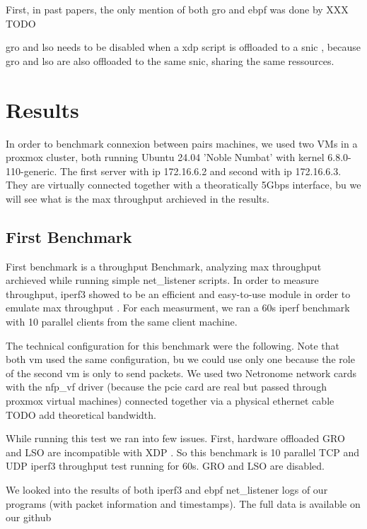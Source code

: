 \documentclass[conference]{IEEEtran}
\begin{document}
First, in past papers, the only mention of both \gls{gro} and \gls{ebpf} was done by XXX TODO

\gls{gro} and \gls{lso} needs to be disabled when a \gls{xdp} script is offloaded to a \gls{snic} \cite{noauthor_ebpf_nodate}, because \gls{gro} and \gls{lso} are also offloaded to the same \gls{snic}, sharing the same ressources. %


\section{Results}
In order to benchmark connexion between pairs machines, we used two VMs in a proxmox cluster, both running Ubuntu 24.04 'Noble Numbat' with kernel 6.8.0-110-generic. The first server with ip 172.16.6.2 and second with ip 172.16.6.3.
They are virtually connected together with a theoratically 5Gbps interface, bu we will see what is the max throughput archieved in the results.

\subsection{First Benchmark}

First benchmark is a throughput Benchmark, analyzing max throughput archieved while running simple net\_listener scripts. In order to measure throughput, iperf3 showed to be an efficient and easy-to-use module in order to emulate max throughput \cite{bachl_flow-based_2022}. For each measurment, we ran a 60s iperf benchmark with 10 parallel clients from the same client machine.

The technical configuration for this benchmark were the following. Note that both \gls{vm} used the same configuration, bu we could use only one because the role of the second \gls{vm} is only to send packets. We used two Netronome network cards with the nfp\_vf driver (because the pcie card are real but passed through proxmox virtual machines) connected together via a physical ethernet cable TODO add theoretical bandwidth. 

While running this test we ran into few issues. First, hardware offloaded GRO and LSO are incompatible with XDP \cite{noauthor_ebpf_nodate}. So this benchmark is 10 parallel TCP and UDP iperf3 throughput test running for 60s. GRO and LSO are disabled.

We looked into the results of both iperf3 and \gls{ebpf} net\_listener logs of our programs (with packet information and timestamps). The full data is available on our github %
\end{document}
